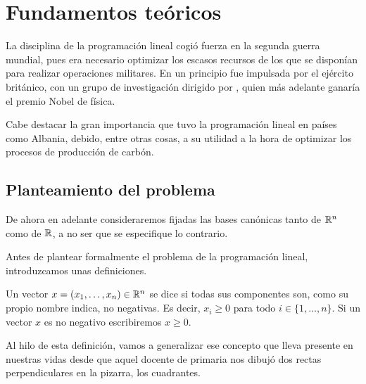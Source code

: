 \chapter{Fundamentos teóricos}
\label{fund}
La disciplina de la programación lineal cogió fuerza en la segunda guerra mundial, pues era necesario optimizar los escasos recursos de los que se disponían para realizar operaciones militares. En un principio fue impulsada por el ejército británico, con un grupo de investigación dirigido por , quien más adelante ganaría el premio Nobel de física.

Cabe destacar la gran importancia que tuvo la programación lineal en países como Albania, debido, entre otras cosas, a su utilidad a la hora de optimizar los procesos de producción de carbón. 
\section{Planteamiento del problema}
De ahora en adelante consideraremos fijadas las bases canónicas tanto de $\mathbb{R}^n$ como de $\mathbb{R}$, a no ser que se especifique lo contrario.

Antes de plantear formalmente el problema de la programación lineal, introduzcamos unas definiciones.

\begin{defi}
	Un vector $x=(x_1,\dots,x_n)\in\mathbb{R}^n$ se dice  si todas sus componentes son, como su propio nombre indica, no negativas. Es decir, $x_i\geq 0$ para todo $i\in\{1,\dots,n\}$. Si un vector $x$ es no negativo escribiremos $x\geq 0$.
\end{defi}
Al hilo de esta definición, vamos a generalizar ese concepto que lleva presente en nuestras vidas desde que aquel docente de primaria nos dibujó dos rectas perpendiculares en la pizarra, los cuadrantes.

